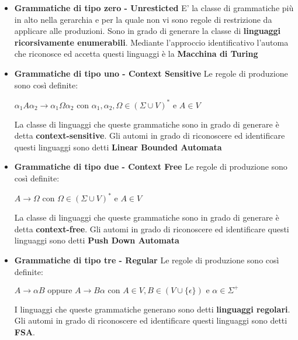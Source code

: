  \begin{itemize}
 \item \textbf{Grammatiche di tipo zero - Unresticted} E' la classe di grammatiche più in alto nella gerarchia e per la quale non vi sono regole di restrizione da applicare alle produzioni. Sono in grado di generare la classe di \textbf{linguaggi ricorsivamente enumerabili}. Mediante l'approccio identificativo l'automa che riconosce ed accetta questi linguaggi è la \textbf{Macchina di Turing}
 \item \textbf{Grammatiche di tipo uno - Context Sensitive} Le regole di produzione sono così definite:\\
 \centerline{$\alpha_1 A \alpha_2 \rightarrow \alpha_1 \Omega \alpha_2 \text{ con } \alpha_1 ,\alpha_2 ,\Omega \in (\Sigma \cup V)^{*} \text{ e } A \in V$}
 
  La classe di linguaggi che queste grammatiche sono in grado di generare è detta \textbf{context-sensitive}. Gli automi in grado di riconoscere ed identificare questi linguaggi sono detti \textbf{Linear Bounded Automata}
 \item \textbf{Grammatiche di tipo due - Context Free} Le regole di produzione sono così definite:\\
 \centerline{$A \rightarrow \Omega \text{ con } \Omega \in (\Sigma \cup V)^{*} \text{ e } A \in V$}
 
  La classe di linguaggi che queste grammatiche sono in grado di generare è detta \textbf{context-free}. Gli automi in grado di riconoscere ed identificare questi linguaggi sono detti \textbf{Push Down Automata}
 \item \textbf{Grammatiche di tipo tre - Regular} Le regole di produzione sono così definite:\\
 \centerline{$A \rightarrow \alpha B \text{ oppure } A \rightarrow B\alpha  \text{ con } A \in V, B \in (V \cup \{\epsilon\}) \text{ e } \alpha \in \Sigma^{+}$}
 
 I linguaggi che queste grammatiche generano sono detti \textbf{linguaggi regolari}. Gli automi in grado di riconoscere ed identificare questi linguaggi sono detti \textbf{\ac{FSA}}.    
 \end{itemize}
 

